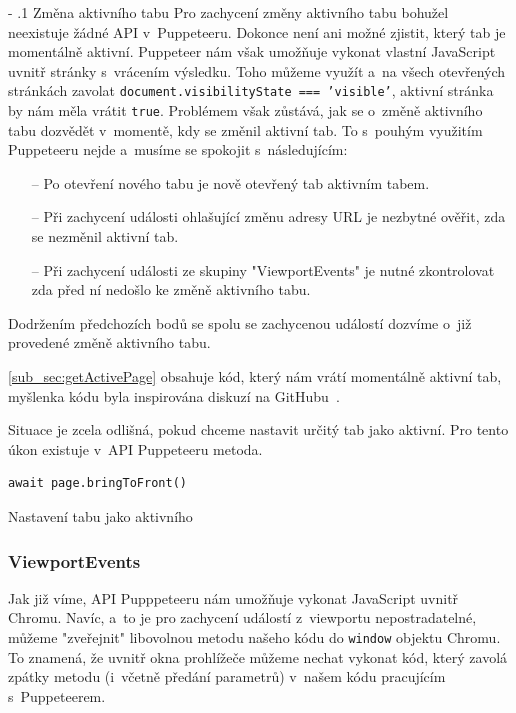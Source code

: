 \documentclass[12pt, a4paper, twoside]{article}
\makeatletter
\newcommand{\codefigureSpacing}{1.2}
\renewcommand\paragraph{%
	\@startsection{subparagraph}{5}{0mm}%
	{-\baselineskip}%
	{.1\baselineskip}%
	{\normalfont\normalsize\bfseries}}
\makeatother
\begin{document}
	\paragraph{Změna aktivního tabu}
	Pro zachycení změny aktivního tabu bohužel neexistuje žádné API v~Puppeteeru. Dokonce není ani možné zjistit, který tab je momentálně aktivní. Puppeteer nám však umožňuje vykonat vlastní JavaScript uvnitř stránky s~vrácením výsledku. Toho můžeme využít a~na všech otevřených stránkách zavolat \texttt{document.visibilityState === 'visible'}, aktivní stránka by nám měla vrátit \texttt{true}. Problémem však zůstává, jak se o~změně aktivního tabu dozvědět v~momentě, kdy se změnil aktivní tab. To s~pouhým využitím Puppeteeru nejde a~musíme se spokojit s~následujícím:
	\begin{itemize}
		\item[--] Po otevření nového tabu je nově otevřený tab aktivním tabem.
		\item[--] Při zachycení události ohlašující změnu adresy URL je nezbytné ověřit, zda se nezměnil aktivní tab.
		\item[--] Při zachycení události ze skupiny "ViewportEvents" je nutné zkontrolovat zda před ní nedošlo ke změně aktivního tabu.
	\end{itemize}
	Dodržením předchozích bodů se spolu se zachycenou událostí dozvíme o~již provedené změně aktivního tabu. 
	
	\ref{sub_sec:getActivePage} obsahuje kód, který nám vrátí momentálně aktivní tab, myšlenka kódu byla inspirována diskuzí na GitHubu~\cite{getActivePagePupppeteer}.
	
	Situace je zcela odlišná, pokud chceme nastavit určitý tab jako aktivní. Pro tento úkon existuje v~API Puppeteeru metoda.
\begin{codefigure}[H]
	\renewcommand\baselinestretch{\codefigureSpacing}
	\begin{lstlisting}[style=MyJavaScript]
await page.bringToFront()
	\end{lstlisting}
	\caption{Nastavení tabu jako aktivního}
\end{codefigure}
	\subsubsection{ViewportEvents}
	Jak již víme, API Pupppeteeru nám umožňuje vykonat JavaScript uvnitř Chromu. Navíc, a~to je pro zachycení událostí z~viewportu nepostradatelné, můžeme "zveřejnit" libovolnou metodu našeho kódu do \texttt{window} objektu Chromu. To znamená, že uvnitř okna prohlížeče můžeme nechat vykonat kód, který zavolá  zpátky metodu (i~včetně předání parametrů) v~našem kódu pracujícím s~Puppeteerem.
	
\end{document}
